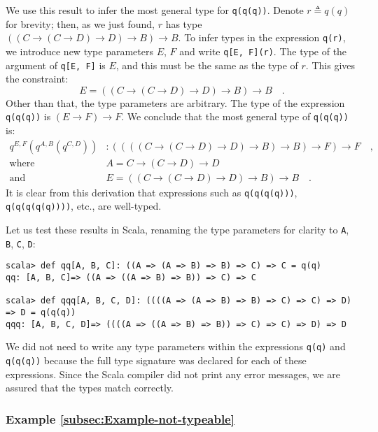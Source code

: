 We use this result to infer the most general type for \lstinline!q(q(q))!.
Denote $r\triangleq q(q)$ for brevity; then, as we just found, $r$
has type $\left(\left(C\rightarrow\left(C\rightarrow D\right)\rightarrow D\right)\rightarrow B\right)\rightarrow B$.
To infer types in the expression \lstinline!q(r)!, we introduce new
type parameters $E$, $F$ and write \lstinline!q[E, F](r)!. The
type of the argument of \lstinline!q[E, F]! is $E$, and this must
be the same as the type of $r$. This gives the constraint:
\[
E=\left(\left(C\rightarrow\left(C\rightarrow D\right)\rightarrow D\right)\rightarrow B\right)\rightarrow B\quad.
\]
Other than that, the type parameters are arbitrary. The type of the
expression \lstinline!q(q(q))! is $\left(E\rightarrow F\right)\rightarrow F$.
We conclude that the most general type of \lstinline!q(q(q))! is:
\begin{align*}
q^{E,F}(q^{A,B}(q^{C,D})) & :\left(\left(\left(\left(C\rightarrow\left(C\rightarrow D\right)\rightarrow D\right)\rightarrow B\right)\rightarrow B\right)\rightarrow F\right)\rightarrow F\quad,\\
\text{where}\quad & A=C\rightarrow\left(C\rightarrow D\right)\rightarrow D\\
\text{and}\quad & E=\left(\left(C\rightarrow\left(C\rightarrow D\right)\rightarrow D\right)\rightarrow B\right)\rightarrow B\quad.
\end{align*}
It is clear from this derivation that expressions such as \lstinline!q(q(q(q)))!,
\lstinline!q(q(q(q(q))))!, etc., are well-typed.

Let us test these results in Scala, renaming the type parameters for
clarity to \lstinline!A!, \lstinline!B!, \lstinline!C!, \lstinline!D!:
\begin{lstlisting}
scala> def qq[A, B, C]: ((A => (A => B) => B) => C) => C = q(q)
qq: [A, B, C]=> ((A => ((A => B) => B)) => C) => C

scala> def qqq[A, B, C, D]: ((((A => (A => B) => B) => C) => C) => D) => D = q(q(q))
qqq: [A, B, C, D]=> ((((A => ((A => B) => B)) => C) => C) => D) => D
\end{lstlisting}
We did not need to write any type parameters within the expressions
\lstinline!q(q)! and \lstinline!q(q(q))! because the full type signature
was declared for each of these expressions. Since the Scala compiler
did not print any error messages, we are assured that the types match
correctly.

\subsubsection{Example \label{subsec:Example-not-typeable}\ref{subsec:Example-not-typeable}}

